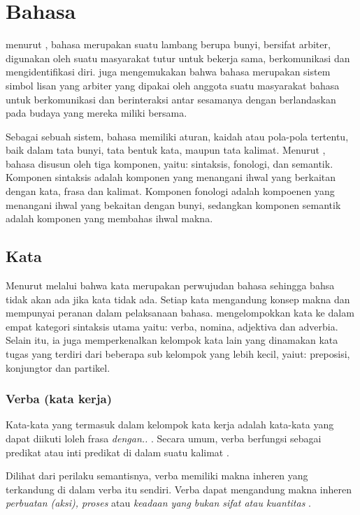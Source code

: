 \section{Bahasa} %
\label{sec:section_name}
menurut \citet{chaer}, bahasa merupakan suatu lambang berupa bunyi, bersifat arbiter, digunakan oleh suatu masyarakat tutur untuk bekerja sama, berkomunikasi dan mengidentifikasi diri. \citet{dardjo} juga mengemukakan bahwa bahasa merupakan sistem simbol lisan yang arbiter yang dipakai oleh anggota suatu masyarakat bahasa untuk berkomunikasi dan berinteraksi antar sesamanya dengan berlandaskan pada budaya yang mereka miliki bersama.

Sebagai sebuah sistem, bahasa memiliki aturan, kaidah atau pola-pola tertentu, baik dalam tata bunyi, tata bentuk kata, maupun tata kalimat. Menurut \citet{dardjo}, bahasa disusun oleh tiga komponen, yaitu: sintaksis, fonologi, dan semantik. Komponen sintaksis adalah komponen yang menangani ihwal yang berkaitan dengan kata, frasa dan kalimat. Komponen fonologi adalah kompoenen yang menangani ihwal yang bekaitan dengan bunyi, sedangkan komponen semantik adalah komponen yang membahas ihwal makna.

\subsection{Kata}
Menurut \citet{chaer} melalui \citet{suryawan} bahwa kata merupakan perwujudan bahasa sehingga bahsa tidak akan ada jika kata tidak ada. Setiap kata mengandung konsep makna dan mempunyai peranan dalam pelaksanaan bahasa. \citet{alwi} mengelompokkan kata ke dalam empat kategori sintaksis utama yaitu: verba, nomina, adjektiva dan adverbia. Selain itu, ia juga memperkenalkan kelompok kata lain yang dinamakan kata tugas yang terdiri dari beberapa sub kelompok yang lebih kecil, yaiut: preposisi, konjungtor dan partikel.

\subsubsection{Verba (kata kerja)}
Kata-kata yang termasuk dalam kelompok kata kerja adalah kata-kata yang dapat diikuti loleh frasa \emph{dengan..} \citet{chaer}. Secara umum, verba berfungsi sebagai predikat atau inti predikat di dalam suatu kalimat \citep{alwi}.

Dilihat dari perilaku semantisnya, verba memiliki makna inheren yang terkandung di dalam verba itu sendiri. Verba dapat mengandung makna inheren \emph{perbuatan (aksi), proses} atau \emph{keadaan yang bukan sifat atau kuantitas} \citep{alwi}.

